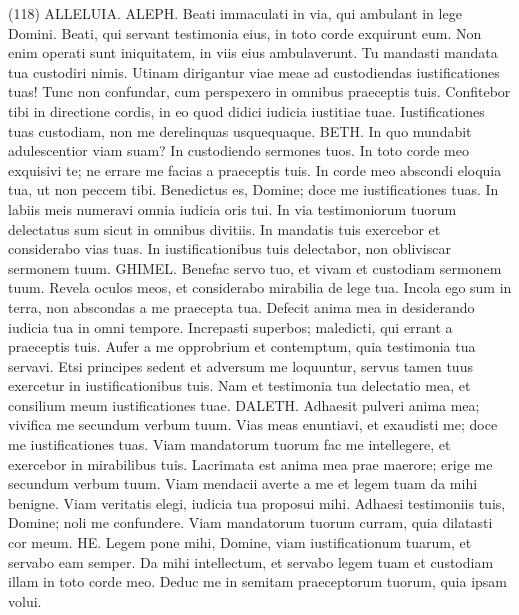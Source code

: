\begin{biblechapter} (118) 
\verse ALLELUIA. ALEPH. Beati immaculati in via, qui ambulant in lege Domini. 
\verse Beati, qui servant testimonia eius, in toto corde exquirunt eum. 
\verse Non enim operati sunt iniquitatem, in viis eius ambulaverunt. 
\verse Tu mandasti mandata tua custodiri nimis. 
\verse Utinam dirigantur viae meae ad custodiendas iustificationes tuas! 
\verse Tunc non confundar, cum perspexero in omnibus praeceptis tuis. 
\verse Confitebor tibi in directione cordis, in eo quod didici iudicia iustitiae tuae. 
\verse Iustificationes tuas custodiam, non me derelinquas usquequaque. 
\verse BETH. In quo mundabit adulescentior viam suam? In custodiendo sermones tuos. 
\verse In toto corde meo exquisivi te; ne errare me facias a praeceptis tuis. 
\verse In corde meo abscondi eloquia tua, ut non peccem tibi. 
\verse Benedictus es, Domine; doce me iustificationes tuas. 
\verse In labiis meis numeravi omnia iudicia oris tui. 
\verse In via testimoniorum tuorum delectatus sum sicut in omnibus divitiis. 
\verse In mandatis tuis exercebor et considerabo vias tuas. 
\verse In iustificationibus tuis delectabor, non obliviscar sermonem tuum. 
\verse GHIMEL. Benefac servo tuo, et vivam et custodiam sermonem tuum. 
\verse Revela oculos meos, et considerabo mirabilia de lege tua. 
\verse Incola ego sum in terra, non abscondas a me praecepta tua. 
\verse Defecit anima mea in desiderando iudicia tua in omni tempore. 
\verse Increpasti superbos; maledicti, qui errant a praeceptis tuis. 
\verse Aufer a me opprobrium et contemptum, quia testimonia tua servavi. 
\verse Etsi principes sedent et adversum me loquuntur, servus tamen tuus exercetur in iustificationibus tuis. 
\verse Nam et testimonia tua delectatio mea, et consilium meum iustificationes tuae. 
\verse DALETH. Adhaesit pulveri anima mea; vivifica me secundum verbum tuum. 
\verse Vias meas enuntiavi, et exaudisti me; doce me iustificationes tuas. 
\verse Viam mandatorum tuorum fac me intellegere, et exercebor in mirabilibus tuis. 
\verse Lacrimata est anima mea prae maerore; erige me secundum verbum tuum. 
\verse Viam mendacii averte a me et legem tuam da mihi benigne. 
\verse Viam veritatis elegi, iudicia tua proposui mihi. 
\verse Adhaesi testimoniis tuis, Domine; noli me confundere. 
\verse Viam mandatorum tuorum curram, quia dilatasti cor meum. 
\verse HE. Legem pone mihi, Domine, viam iustificationum tuarum, et servabo eam semper. 
\verse Da mihi intellectum, et servabo legem tuam et custodiam illam in toto corde meo. 
\verse Deduc me in semitam praeceptorum tuorum, quia ipsam volui. 

\end{biblechapter}
